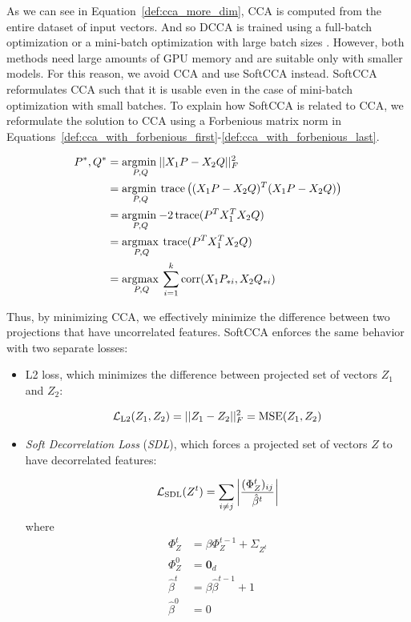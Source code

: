 As we can see in Equation~\ref{def:cca_more_dim}, CCA is computed from the
entire dataset of input vectors. And so DCCA is trained using a full-batch
optimization \citep{andrew2013deep} or a mini-batch optimization with large
batch sizes \citep{wang2015unsupervised}. However, both methods need large
amounts of GPU memory and are suitable only with smaller models. For this
reason, we avoid CCA and use SoftCCA \citep{chang2018scalable} instead. SoftCCA
reformulates CCA such that it is usable even in the case of mini-batch
optimization with small batches. To explain how SoftCCA is related to CCA, we
reformulate the solution to CCA using a Forbenious matrix norm in
Equations~\ref{def:cca_with_forbenious_first}-\ref{def:cca_with_forbenious_last}.

\begin{align}
  P^\ast, Q^\ast &= \underset{P, Q}{\operatorname*{\arg\!\min\medspace}} ||X_1P - X_2Q||^2_F \label{def:cca_with_forbenious_first} \\
  &= \underset{P, Q}{\operatorname*{\arg\!\min\medspace}} \operatorname*{trace}\left((X_1P - X_2Q)^T(X_1P - X_2Q)\right) \\
  &= \underset{P, Q}{\operatorname*{\arg\!\min\medspace}} {-2} \operatorname*{trace}(P^TX_1^TX_2Q) \\
  &= \underset{P, Q}{\operatorname*{\arg\!\max\medspace}} \operatorname*{trace}(P^TX_1^TX_2Q) \\
  &= \underset{P, Q}{\operatorname*{\arg\!\max\medspace}} \sum_{i = 1}^k \operatorname*{corr}(X_1P_{*i}, X_2Q_{*i}) \label{def:cca_with_forbenious_last}
\end{align}

Thus, by minimizing CCA, we effectively minimize the difference between two
projections that have uncorrelated features. SoftCCA enforces the same behavior
with two separate losses:

\begin{itemize}

  \item L2 loss, which minimizes the difference between projected set of
    vectors $Z_1$ and $Z_2$:

    \begin{equation}
      \mathcal{L}_{\text{L2}}(Z_1, Z_2) = ||Z_1 - Z_2||^2_F = \operatorname*{MSE}(Z_1, Z_2)
    \end{equation}

  \item \emph{Soft Decorrelation Loss} (\emph{SDL}), which forces a projected
    set of vectors $Z$ to have decorrelated features:

    \begin{equation}
      \mathcal{L}_{\text{SDL}}(Z^t) = \sum_{i \ne j} \left|
          \frac{(\Phi^t_Z)_{ij}}{\hat{\beta}^t}
          \right|
    \end{equation}
    where
    \begin{align}
      \Phi^t_Z &= \beta \Phi^{t-1}_Z + \Sigma_{Z^t} \\
      \Phi^0_Z &= \bm{0}_d \\
      \hat{\beta}^t &= \beta \hat{\beta}^{t-1} + 1 \\
      \hat{\beta}^0 &= 0
    \end{align}

\end{itemize}

